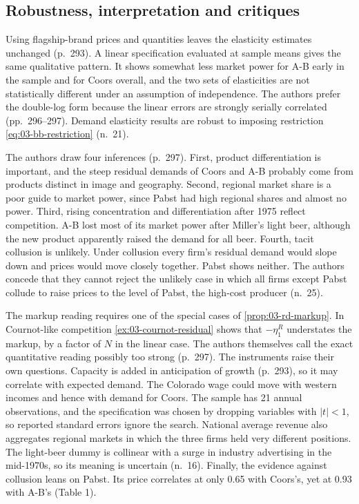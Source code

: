 \subsection{Robustness, interpretation and critiques}\label{sec:03-bb-critique}

 Using flagship-brand prices and quantities leaves the elasticity estimates unchanged
(p.~293). A linear specification evaluated at sample means gives the same qualitative pattern. It shows
somewhat less market power for A-B early in the sample and for Coors overall, and the two sets of
elasticities are not statistically different under an assumption of independence. The authors prefer the
double-log form because the linear errors are strongly serially correlated (pp.~296--297). Demand elasticity
results are robust to imposing restriction \eqref{eq:03-bb-restriction} (n.~21).

 The authors draw four inferences (p.~297). First, product differentiation is
important, and the steep residual demands of Coors and A-B probably come from products distinct in image and
geography. Second, regional market share is a poor guide to market power, since Pabst had high regional
shares and almost no power. Third, rising concentration and differentiation after 1975 reflect competition.
A-B lost most of its market power after Miller's light beer, although the new product apparently raised the
demand for all beer. Fourth, tacit collusion is unlikely. Under collusion every firm's residual demand would
slope down and prices would move closely together. Pabst shows neither. The authors concede that they cannot
reject the unlikely case in which all firms except Pabst collude to raise prices to the level of Pabst, the
high-cost producer (n.~25).

 The markup reading requires one of the special cases of \cref{prop:03-rd-markup}. In
Cournot-like competition \cref{ex:03-cournot-residual} shows that $-\eta^R_1$ understates the markup, by a
factor of $N$ in the linear case. The authors themselves call the exact quantitative reading possibly too
strong (p.~297). The instruments raise their own questions. Capacity is added in anticipation of growth
(p.~293), so it may correlate with expected demand. The Colorado wage could move with western incomes and
hence with demand for Coors. The sample has 21 annual observations, and the specification was chosen by
dropping variables with $|t| < 1$, so reported standard errors ignore the search. National average revenue
also aggregates regional markets in which the three firms held very different positions. The light-beer dummy
is collinear with a surge in industry advertising in the mid-1970s, so its meaning is uncertain (n.~16).
Finally, the evidence against collusion leans on Pabst. Its price correlates at only 0.65 with Coors's, yet
at 0.93 with A-B's (Table 1).

